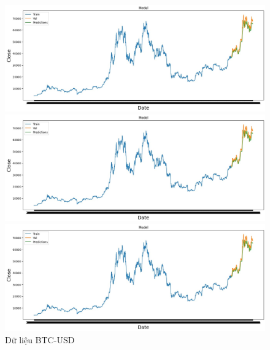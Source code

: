 \documentclass[conference]{IEEEtran}
\begin{document}
	\begin{figure}[H]
		\centering
		\begin{minipage}{0.15\textwidth}
			\centering
			\includegraphics[width=1\textwidth]{Figure/BTC_LSTM.jpg}
		\end{minipage}
		\hfill
		\begin{minipage}{0.15\textwidth}
			\centering
			\includegraphics[width=1\textwidth]{Figure/BTC_LSTM.jpg}
		\end{minipage}
		\hfill
		\begin{minipage}{0.15\textwidth}
			\centering
			\includegraphics[width=1\textwidth]{Figure/BTC_LSTM.jpg}
		\end{minipage}
		\caption{Dữ liệu BTC-USD}
		\label{fig:1}
	\end{figure}
	
\end{document}
